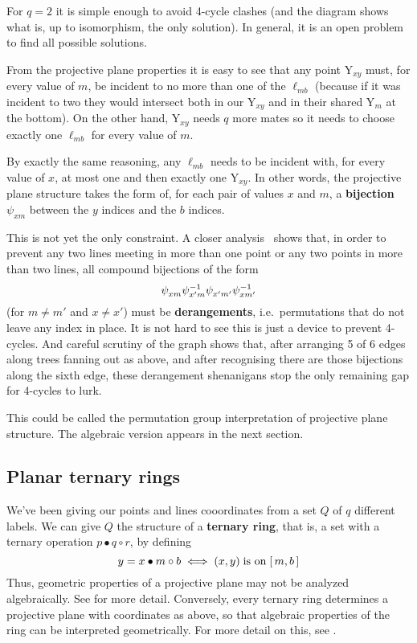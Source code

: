 \documentclass[12pt]{article}
\let\oso\Longleftrightarrow
\begin{document}
For $q=2$ it is simple enough to avoid 4-cycle clashes (and the diagram shows
what is, up to isomorphism, the only solution). In general, it is an open
problem to find all possible solutions.

From the projective plane properties it is easy to see that any point Y$_{xy}$ must, for
every value of $m$, be incident to no more than one of the $\ell_{mb}$ (because
if it was incident to two they would intersect both in our Y$_{xy}$ and in
their shared Y$_m$ at the bottom). On the other hand, Y$_{xy}$ needs $q$ more
mates so it needs to choose exactly one $\ell_{mb}$ for every value of $m$.

By exactly the same reasoning, any $\ell_{mb}$ needs to be incident with, for
every value of $x$, at most one and then exactly one Y$_{xy}$. In other words,
the projective plane structure takes the form of, for each pair of values $x$ and $m$,
a {\bf bijection} $\psi_{xm}$ between the $y$ indices and the $b$ indices.

This is not yet the only constraint. A closer analysis~\cite{vG03} shows
that, in order to prevent any two {\sc line}s meeting in more than one {\sc point} or any
two {\sc point}s in more than two {\sc line}s, all compound bijections of the form
$$
  \psi_{xm}^{\vphantom1} \psi_{x'm}^{-1}
  \psi_{x'm'}^{\vphantom1} \psi_{xm'}^{-1}
$$
(for $m \ne m'$ and $x \ne x'$) must be {\bf derangements}, i.e.\
permutations that do not leave any index in place. It is not hard to see
this is just a device to prevent 4-cycles. And careful scrutiny of the graph
shows that, after arranging 5 of 6 edges along trees fanning out as above, and
after recognising there are those bijections along the sixth edge, these
derangement shenanigans stop the only remaining gap for 4-cycles to lurk.

This could be called the permutation group interpretation of projective plane structure.
The algebraic version appears in the next section.

\clearpage
\subsection*{Planar ternary rings}

We've been giving our {\sc point}s and {\sc line}s cooordinates from a set $Q$ of $q$ different labels.   We can give $Q$ the structure of a {\bf ternary ring}, that is, a set with a ternary operation $p\bullet q\circ r$, by defining
\begin{equation}\label{x*mob}
  y = x\bullet m\circ b \;\oso\; (x,y) \;\hbox{is on}\; [\,m,b\,]
\end{equation}
Thus, geometric properties of a projective plane may not be analyzed algebraically.  See  for more detail.  Conversely, every ternary ring determines a projective plane with coordinates as above, so that algebraic properties of the ring can be interpreted geometrically.  For more detail on this, see .
\end{document}
